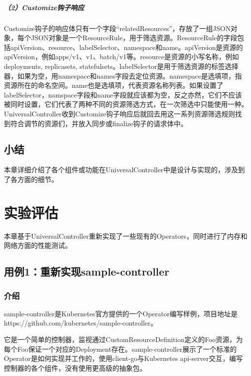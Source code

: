 \documentclass[macfonts,master]{njuthesis}
\begin{document}
\paragraph{（2）Customize钩子响应}
Customize钩子的响应体只有一个字段``relatedResources''，存放了一组JSON对象，每个JSON对象是一个ResourceRule，用于筛选资源。ResourceRule的字段包括apiVersion、resource、labelSelector、namespace和name。apiVersion是资源的apiVersion，例如apps/v1、v1、batch/v1等。resource是资源的小写名称，例如deployments, replicasets, statefulsets。labelSelector是用于筛选资源的标签选择器，如果为空，用namespace和names字段去定位资源。namespace是选填项，指资源所在的命名空间。name也是选填项，代表资源名称列表。如果设置了labelSelector，namspace字段和name字段就应该都为空，反之亦然，它们不应该被同时设置，它们代表了两种不同的资源筛选方式，在一次筛选中只能使用一种。UniversalController收到Customize钩子响应后就回去用这一系列资源筛选规则找到符合调节的资源们，并放入同步或finalize钩子的请求体中。

\section{小结}
本章详细介绍了各个组件或功能在UniversalController中是设计与实现的，涉及到了各方面的细节。

\chapter{实验评估}\label{chapter_experiments}

本章基于UniversalController重新实现了一些现有的Operators，同时进行了内存和网络方面的性能测试。

\section{用例1：重新实现sample-controller}\label{section:sample-controller}
\subsection{介绍}
sample-controller是Kubernetes官方提供的一个Operator编写样例，项目地址是https://github.com/kubernetes/sample-controller。

它是一个简单的控制器，监视通过CustomResourceDefinition定义的Foo资源，为每个Foo保证一个对应的Deployment存在。sample-controller展示了一个标准的Operator是如何实现并工作的，使用client-go与Kubernetes api-server交互，编写控制器的各个组件，没有使用更高级的抽象包。
\end{document}

